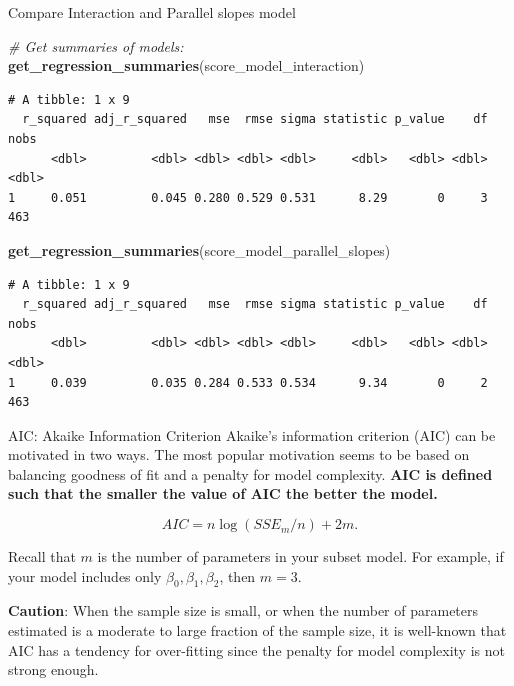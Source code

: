 \documentclass[
  ignorenonframetext,
]{beamer}
\newenvironment{Shaded}{\begin{snugshade}}{\end{snugshade}}
\newcommand{\CommentTok}[1]{\textcolor[rgb]{0.56,0.35,0.01}{\textit{#1}}}
\newcommand{\FunctionTok}[1]{\textcolor[rgb]{0.13,0.29,0.53}{\textbf{#1}}}
\newcommand{\NormalTok}[1]{#1}
\begin{document}
\begin{frame}[fragile]{Compare Interaction and Parallel slopes model}
\label{compare-interaction-and-parallel-slopes-model-2}
\footnotesize

\begin{Shaded}
\begin{Highlighting}[]
\CommentTok{\# Get summaries of models:}
\FunctionTok{get\_regression\_summaries}\NormalTok{(score\_model\_interaction)}
\end{Highlighting}
\end{Shaded}

\begin{verbatim}
# A tibble: 1 x 9
  r_squared adj_r_squared   mse  rmse sigma statistic p_value    df  nobs
      <dbl>         <dbl> <dbl> <dbl> <dbl>     <dbl>   <dbl> <dbl> <dbl>
1     0.051         0.045 0.280 0.529 0.531      8.29       0     3   463
\end{verbatim}

\begin{Shaded}
\begin{Highlighting}[]
\FunctionTok{get\_regression\_summaries}\NormalTok{(score\_model\_parallel\_slopes)}
\end{Highlighting}
\end{Shaded}

\begin{verbatim}
# A tibble: 1 x 9
  r_squared adj_r_squared   mse  rmse sigma statistic p_value    df  nobs
      <dbl>         <dbl> <dbl> <dbl> <dbl>     <dbl>   <dbl> <dbl> <dbl>
1     0.039         0.035 0.284 0.533 0.534      9.34       0     2   463
\end{verbatim}

\normalsize
\end{frame}

\begin{frame}{AIC: Akaike Information Criterion}
\label{aic-akaike-information-criterion}
Akaike's information criterion (AIC) can be motivated in two ways. The
most popular motivation seems to be based on balancing goodness of fit
and a penalty for model complexity. \textbf{AIC is defined such that the
smaller the value of AIC the better the model.}

\[AIC=n\log(SSE_{m}/n)+2m.\]

Recall that \(m\) is the number of parameters in your subset model. For
example, if your model includes only \(\beta_0, \beta_1, \beta_2\), then
\(m = 3\).

\textbf{Caution}: When the sample size is small, or when the number of
parameters estimated is a moderate to large fraction of the sample size,
it is well-known that AIC has a tendency for over-fitting since the
penalty for model complexity is not strong enough.
\end{frame}
\end{document}
